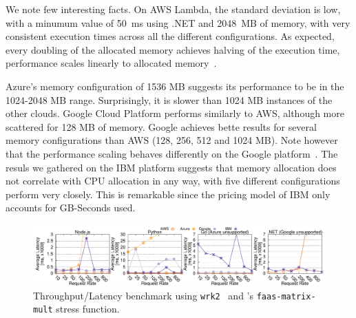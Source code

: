 We note few interesting facts.
On \gls{AWS} Lambda, the standard deviation is low, with a minumum value of 50~ms using .NET and  2048~MB of memory, with very consistent execution times across all the different configurations. 
As expected, every doubling of the allocated memory achieves halving of the execution time, performance scales linearly to allocated memory~\cite{AWSLambdaConfig}. 

Azure's memory configuration of 1536 \gls{MB} suggests its performance to be in the 1024-2048 \gls{MB} range.
Surprisingly, it is slower than 1024 \gls{MB} instances of the other clouds.  
Google Cloud Platform performs similarly to \gls{AWS}, although more scattered for 128 \gls{MB} of memory. 
Google achieves bette results for several memory configurations than \gls{AWS} (128, 256, 512 and 1024 \gls{MB}). %
Note however that the performance scaling behaves differently on the Google platform~\cite{GoogleFunctionsPricing}.
The resuls we gathered on the \gls{IBM} platform suggests that memory allocation does not correlate with \gls{CPU} allocation in any way, with five different configurations perform very closely. 
This is remarkable since the pricing model of \gls{IBM} only accounts for GB-Seconds used. 

\begin{figure}[!t]
\centering
\includegraphics[scale=0.7]{bilder/loadtest_average_latency/tputlat_combined.pdf}
\caption{Throughput/Latency benchmark using \texttt{wrk2}~\cite{wrk2} and \sys's  \texttt{faas-matrix-mult} stress function.}
\label{fig:load_test_latency_all}
\end{figure}

